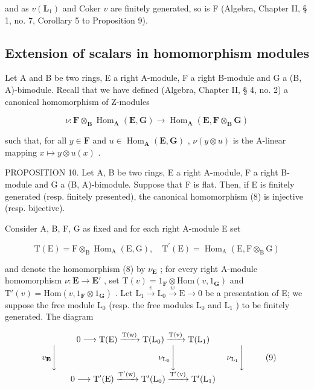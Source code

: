 and as \(v(\mathbf{L}_1)\) and Coker \(v\) are finitely generated, so is F (Algebra, Chapter II, § 1, no. 7, Corollary 5 to Proposition 9).

\subsection{Extension of scalars in homomorphism modules}

Let A and B be two rings, E a right A-module, F a right B-module and G a (B, A)-bimodule. Recall that we have defined (Algebra, Chapter II, § 4, no. 2) a canonical homomorphism of Z-modules

\[
\nu \colon \mathbf {F} \otimes_ {\mathbf {B}} \operatorname{Hom} _ {\mathbf {A}} (\mathbf {E}, \mathbf {G}) \rightarrow \operatorname{Hom} _ {\mathbf {A}} (\mathbf {E}, \mathbf {F} \otimes_ {\mathbf {B}} \mathbf {G})\tag{8}
\]

such that, for all \(y \in \mathbf{F}\) and \(u \in \operatorname{Hom}_{\mathbf{A}}(\mathbf{E}, \mathbf{G})\) , \(\nu(y \otimes u)\) is the A-linear mapping \(x \mapsto y \otimes u(x)\) .

PROPOSITION 10. Let A, B be two rings, E a right A-module, F a right B-module and G a (B, A)-bimodule. Suppose that F is flat. Then, if E is finitely generated (resp. finitely presented), the canonical homomorphism (8) is injective (resp. bijective).

Consider A, B, F, G as fixed and for each right A-module E set

\[
\mathrm{T} (\mathrm{E}) = \mathrm{F} \otimes_ {\mathrm{B}} \operatorname{Hom} _ {\mathrm{A}} (\mathrm{E}, \mathrm{G}), \quad \mathrm{T} ^ {\prime} (\mathrm{E}) = \operatorname{Hom} _ {\mathrm{A}} (\mathrm{E}, \mathrm{F} \otimes_ {\mathrm{B}} \mathrm{G})
\]

and denote the homomorphism (8) by \(\nu_{\mathbf{E}}\) ; for every right A-module homomorphism \(\nu: \mathbf{E} \to \mathbf{E}'\) , set \(\mathrm{T}(v) = 1_{\mathbf{F}} \otimes \mathrm{Hom}(v, 1_{\mathbf{G}})\) and \(\mathrm{T}'(v) = \mathrm{Hom}(v, 1_{\mathbf{F}} \otimes 1_{\mathbf{G}})\) . Let \(\mathrm{L}_1 \xrightarrow{v} \mathrm{L}_0 \xrightarrow{w} \mathrm{E} \to 0\) be a presentation of E; we suppose the free module \(\mathrm{L}_0\) (resp. the free modules \(\mathrm{L}_0\) and \(\mathrm{L}_1\) ) to be finitely generated. The diagram

\[
\begin{array}{c} 0 \longrightarrow \mathrm{T(E)} \xrightarrow {\mathrm{T(w)}} \mathrm {T(L_ {0})} \xrightarrow {\mathrm{T(v)}} \mathrm {T(L_ {1})} \\ v _ {\mathbf {E}} \Biggl \downarrow \qquad \qquad \qquad \qquad \qquad \qquad \nu_ {\mathrm {L_ {0}}} \Biggl \downarrow \qquad \qquad \qquad \nu_ {\mathrm {L_ {1}}} \Biggl \downarrow \\ 0 \longrightarrow \mathrm {T^ {\prime} (E)} \xrightarrow {\mathrm {T^ {\prime} (w)}} \mathrm {T^ {\prime} (L_ {0})} \xrightarrow {\mathrm {T^ {\prime} (v)}} \mathrm {T^ {\prime} (L_ {1})} \end{array}\tag{9}
\]

